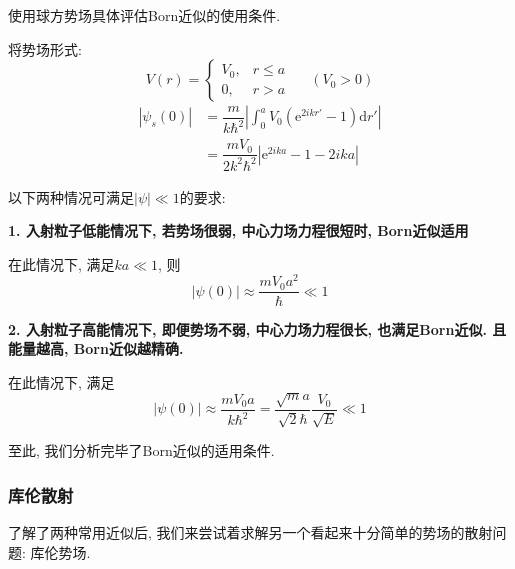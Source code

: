 \documentclass[a4paper, 11pt]{article}
\begin{document}
\begin{spacing}{1.2}
          使用球方势场具体评估Born近似的使用条件.

          将势场形式:
          \begin{equation}
            V(r) = \left\{
              \begin{array}{ll}
                V_0, & r\leq{}a\\
                0, & r>a
              \end{array}\right. \;\;\;\;\;(V_0>0)
          \end{equation}
          \begin{equation}
            \begin{aligned}
              \left|\psi_s(0)\right| &= \dfrac{m}{k\hbar^2}\left|\int_0^a{}V_0%
                                        \left(\mathrm{e}^{2ikr'}-1\right)\mathrm{d}r'\right|\\
                                      &= \dfrac{mV_0}{2k^2\hbar^2}\left|\mathrm{e}^{2ika}-1-2ika\right|
            \end{aligned}
          \end{equation}

          以下两种情况可满足$|\psi|\ll1$的要求:

          \textbf{1. 入射粒子低能情况下, 若势场很弱, 中心力场力程很短时, Born近似适用}

          在此情况下, 满足$ka\ll1$, 则
          \begin{equation}
            \left|\psi(0)\right| \approx \dfrac{mV_0a^2}{\hbar} \ll 1 
          \end{equation}

          \textbf{2. 入射粒子高能情况下, 即便势场不弱, 中心力场力程很长, 也满足Born近似. 且能量越高, Born近似越精确.}

          在此情况下, 满足
          \begin{equation}
            \left|\psi(0)\right| \approx \dfrac{mV_0a}{k\hbar^2} = \dfrac{\sqrt{m}a}{\sqrt{2}\hbar}%
                                          \dfrac{V_0}{\sqrt{E}} \ll 1 
          \end{equation}

          至此, 我们分析完毕了Born近似的适用条件. 

        \subsubsection{库伦散射}
          了解了两种常用近似后, 我们来尝试着求解另一个看起来十分简单的势场的散射问题: 库伦势场. 


\end{spacing}
\end{document}
